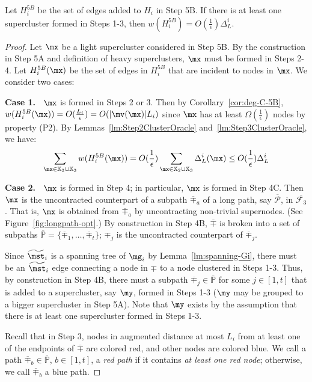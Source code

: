 \begin{lemma}\label{lm:H5B} Let $H^{5B}_{i}$ be the set of edges added to $H_i$ in Step 5B. If there is at least one supercluster formed in Steps 1-3, then $w(H^{5B}_i) = O(\frac{1}{\epsilon}) \Delta^i_{L}$.
\end{lemma}
\begin{proof}	Let $\mx$ be a light supercluster considered in Step 5B. By the construction in Step 5A and definition of heavy superclusters, $\mx$ must be formed in Steps 2-4. Let $H^{5B}_i(\mx)$ be the set of edges in $H^{5B}_i$ that are incident to nodes in $\mx$.	We consider two cases:
	
\noindent \textbf{Case 1.~} $\mx$ is formed in Steps 2 or 3. Then by Corollary~\ref{cor:deg-C-5B}, $w(H^{5B}_i(\mx)) = O(\frac{L_i}{\epsilon}) = O(|\mv(\mx)|L_i)$ since $\mx$ has at least $\Omega(\frac{1}{\epsilon})$ nodes by property (P2). By Lemmas~\ref{lm:Step2ClusterOracle} and~\ref{lm:Step3ClusterOracle}, we have:
	\begin{equation}\label{eq:H5B1}
	\sum_{\mx\in \mathbb{X}_2\cup \mathbb{X}_3} w(H^{5B}_i(\mx)) = O(\frac{1}{\epsilon}) \sum_{\mx\in \mathbb{X}_2\cup \mathbb{X}_3} \Delta^i_{L}(\mx) \leq  O(\frac{1}{\epsilon}) \Delta^i_{L}
	\end{equation}


\noindent \textbf{Case 2.~} $\mx$  is formed in Step 4; in particular, $\mx$ is formed in Step 4C. Then $\mx$ is the uncontracted counterpart of a subpath $\overline{\mp}_a$ of a long path, say $\overline{\mathcal{P}}$, in $\overline{\mathcal{F}_3}$. That is, $\mx$ is obtained from $\overline{\mp}_a$ by uncontracting non-trivial supernodes. (See Figure~\ref{fig:longpath-opt}.) By construction in Step 4B, $\overline{\mp}$ is broken into a set of subpaths $\overline{\mathbb{P}} = \{\overline{\mp}_1, \ldots, \overline{\mp}_t\}$; $\mp_j$ is the uncontracted counterpart of $\overline{\mp}_j$.

Since $\widetilde{\mst}_i$ is a spanning tree of $\mg_i$ by  Lemma~\ref{lm:spanning-Gi}, there must be an $\widetilde{\mst}_i$ edge connecting a node in $\mp$ to a node clustered in Steps 1-3. Thus, by construction in Step 4B, there must a subpath $\overline{\mp}_j \in \overline{\mathbb{P}}$ for some $j \in [1,t]$ that is added to a supercluster, say $\my$, formed in Steps 1-3  ($\my$ may be grouped to a bigger supercluster in Step 5A). Note that $\my$ exists by the assumption that there is at least one supercluster formed in Steps 1-3. 

Recall that in Step 3, nodes in augmented distance at most $L_i$ from at least one of the endpoints of $\overline{\mp}$ are colored red, and other nodes are colored blue. We call a path $\overline{\mp}_b \in \overline{\mathbb{P}}$, $b\in [1,t]$, a \emph{red path} if it contains \emph{at least one red node}; otherwise, we call $\overline{\mp}_b$ a blue path.


\end{proof}
